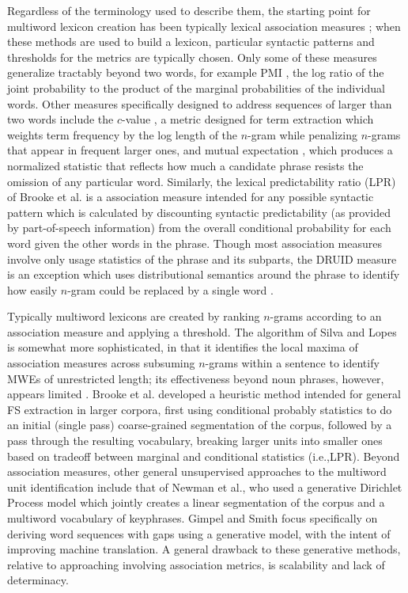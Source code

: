 \documentclass[11pt,letterpaper]{article}
\makeatletter
\def \ie {i.e.,\@ }
\def \al {al.\@ }
\makeatother
\begin{document}
Regardless of the terminology used to describe them, the starting point for multiword lexicon creation has been typically lexical association measures \cite{Church90,Dunning93,Schone01,Evert04,Pecina10,DeAraujo11,Kulkarni11,Ramisch14}; when these methods are used to build a lexicon, particular syntactic patterns and thresholds for the metrics are typically chosen. Only some of these measures generalize tractably beyond two words, for example PMI \cite{Church90}, the log ratio of the joint probability to the product of the marginal probabilities of the individual words. Other measures specifically designed to address sequences of larger than two words include the $c$-value \cite{Frantzi00}, a metric designed for term extraction which weights term frequency by the log length of the $n$-gram while penalizing $n$-grams that appear in frequent larger ones, and mutual expectation \cite{Dias99}, which produces a normalized statistic that reflects how much a candidate phrase resists the omission of any particular word. Similarly, the lexical predictability ratio (LPR) of Brooke et \al \cite{Brooke15b} is a association measure intended for any possible syntactic pattern which is calculated by discounting syntactic predictability (as provided by part-of-speech information) from the overall conditional probability for each word given the other words in the phrase. Though most association measures involve only usage statistics of the phrase and its subparts, the DRUID measure is an exception which uses distributional semantics around the phrase to identify how easily $n$-gram could be replaced by a single word \cite{Riedl15}.

Typically multiword lexicons are created by ranking $n$-grams according to an association measure and applying a threshold. The algorithm of Silva and Lopes  is somewhat more sophisticated, in that it identifies the local maxima of association measures across subsuming $n$-grams within a sentence to identify MWEs of unrestricted length; its effectiveness beyond noun phrases, however, appears limited \cite{Ramisch12}. Brooke et \al {} developed a heuristic method intended for general FS extraction in larger corpora, first using conditional probably statistics to do an initial (single pass) coarse-grained segmentation of the corpus, followed by a pass through the resulting vocabulary, breaking larger units into smaller ones based on tradeoff between marginal and conditional statistics (\ie LPR). Beyond association measures, other general unsupervised approaches to the multiword unit identification include that of Newman et \al {}, who used a generative Dirichlet Process model which jointly creates a linear segmentation of the corpus and a multiword vocabulary of keyphrases. Gimpel and Smith  focus specifically on deriving word sequences with gaps using a generative model, with the intent of improving machine translation. A general drawback to these generative methods, relative to approaching involving association metrics, is scalability and lack of determinacy.
\end{document}
